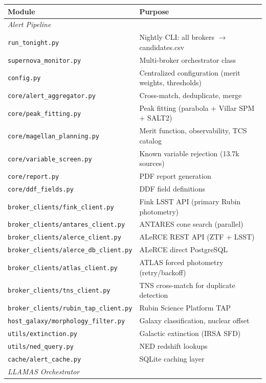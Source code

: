 \documentclass[11pt,letterpaper]{article}
\begin{document}
\begin{center}
\small
\begin{tabular}{ll}
\toprule
Module & Purpose \\
\midrule
\multicolumn{2}{l}{\textit{Alert Pipeline}} \\
\texttt{run\_tonight.py} & Nightly CLI: all brokers $\to$ candidates.csv \\
\texttt{supernova\_monitor.py} & Multi-broker orchestrator class \\
\texttt{config.py} & Centralized configuration (merit weights, thresholds) \\
\texttt{core/alert\_aggregator.py} & Cross-match, deduplicate, merge \\
\texttt{core/peak\_fitting.py} & Peak fitting (parabola + Villar SPM + SALT2) \\
\texttt{core/magellan\_planning.py} & Merit function, observability, TCS catalog \\
\texttt{core/variable\_screen.py} & Known variable rejection (13.7k sources) \\
\texttt{core/report.py} & PDF report generation \\
\texttt{core/ddf\_fields.py} & DDF field definitions \\
\texttt{broker\_clients/fink\_client.py} & Fink LSST API (primary Rubin photometry) \\
\texttt{broker\_clients/antares\_client.py} & ANTARES cone search (parallel) \\
\texttt{broker\_clients/alerce\_client.py} & ALeRCE REST API (ZTF + LSST) \\
\texttt{broker\_clients/alerce\_db\_client.py} & ALeRCE direct PostgreSQL \\
\texttt{broker\_clients/atlas\_client.py} & ATLAS forced photometry (retry/backoff) \\
\texttt{broker\_clients/tns\_client.py} & TNS cross-match for duplicate detection \\
\texttt{broker\_clients/rubin\_tap\_client.py} & Rubin Science Platform TAP \\
\texttt{host\_galaxy/morphology\_filter.py} & Galaxy classification, nuclear offset \\
\texttt{utils/extinction.py} & Galactic extinction (IRSA SFD) \\
\texttt{utils/ned\_query.py} & NED redshift lookups \\
\texttt{cache/alert\_cache.py} & SQLite caching layer \\
\midrule
\multicolumn{2}{l}{\textit{LLAMAS Orchestrator}} \\

\end{tabular}
\end{center}
\end{document}
